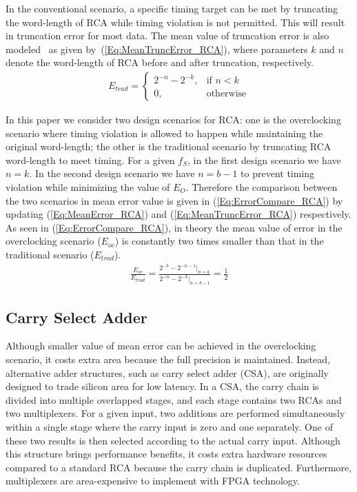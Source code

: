 \documentclass[10pt, conference, compsocconf]{IEEEtran}
\begin{document}
In the conventional scenario, a specific timing target can be met by truncating the word-length of RCA while timing violation is not permitted. This will result in truncation error for most data.  The mean value of truncation error is also modeled~\cite{SKfccm13} as given by~(\ref{Eq:MeanTruncError_RCA}), where parameters $k$ and $n$ denote the word-length of RCA before and after truncation, respectively.
%
\begin{eqnarray}\label{Eq:MeanTruncError_RCA}
    E_{trad}=\left\{
        \begin{matrix}
            2^{-n}-2^{-k}, & \textrm{if $n<k$}\\
            0, & \textrm{otherwise}
        \end{matrix}
        \right.
\end{eqnarray}
\vspace{-2ex}

In this paper we consider two design scenarios for RCA: one is the overclocking scenario where timing violation is allowed to happen while maintaining the original word-length; the other is the traditional scenario by truncating RCA word-length to meet timing. For a given $f_S$, in the first design scenario we have $n=k$. In the second design scenario we have $n=b-1$ to prevent timing violation while minimizing the value of $E_O$. Therefore the comparison between the two scenarios in mean error value is given in (\ref{Eq:ErrorCompare_RCA}) by updating (\ref{Eq:MeanError_RCA}) and (\ref{Eq:MeanTruncError_RCA}) respectively. As seen in (\ref{Eq:ErrorCompare_RCA}), in theory the mean value of error in the overclocking scenario ($E_{oc}$) is constantly two times smaller than that in the traditional scenario ($E_{trad}$).
%
\begin{eqnarray}\label{Eq:ErrorCompare_RCA}
    \frac{E_{oc}}{E_{trad}} = \frac{2^{-b}-2^{-n-1}|_{n=k}}{2^{-n}-2^{-k}|_{n=b-1}}=\frac{1}{2}
\end{eqnarray}

\subsection{Carry Select Adder}
Although smaller value of mean error can be achieved in the overclocking scenario, it costs extra area because the full precision is maintained. Instead, alternative adder structures, such as carry select adder (CSA), are originally designed to trade silicon area for low latency. In a CSA, the carry chain is divided into multiple overlapped stages, and each stage contains two RCAs and two multiplexers. For a given input, two additions are performed simultaneously within a single stage where the carry input is zero and one separately. One of these two results is then selected according to the actual carry input. Although this structure brings performance benefits, it costs extra hardware resources compared to a standard RCA because the carry chain is duplicated. Furthermore, multiplexers are area-expensive to implement with FPGA technology.
\end{document}
